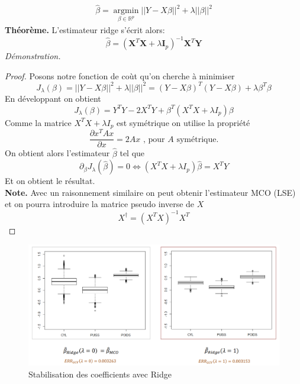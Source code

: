 \documentclass[a4paper]{article}
\newtheorem{proof}{Démonstration}
\begin{document}
\begin{align}
    \hat{\beta} =\underset{{\beta \in \mathbb{R}^p}}{\operatorname{argmin}}  ||Y-X\beta||^2 + \lambda ||\beta||^2 
\end{align}
\textbf{Théorème.} L'estimateur ridge s'écrit alors:
\begin{equation}
    \hat{\beta} = (\textbf{X}^T \textbf{X} +\lambda\textbf{I}_p )^{-1} \textbf{X}^T \textbf{Y}
\end{equation}
\textit{Démonstration.} \begin{proof} Posons notre fonction de coùt qu'on cherche à minimiser
\begin{equation}
    J_{\lambda}(\beta) = ||Y-X\beta||^2 + \lambda ||\beta||^2 = (Y-X\beta)^T(Y-X\beta) + \lambda \beta^T \beta
\end{equation}
En développant on obtient 
\begin{equation*}
    J_{\lambda}(\beta) = Y^T Y - 2X^T Y + \beta^T (X^T X + \lambda I_p) \beta 
\end{equation*}
Comme la matrice $X^T X + \lambda I_p$ est symétrique on utilise la propriété
\begin{equation}
    \frac{\partial x^T A x}{\partial x} = 2 A x \text{  , pour $A$ symétrique.}
\end{equation}
On obtient alors l'estimateur $\hat{\beta}$ tel que
\begin{equation*}
    \partial_{\beta} J_{\lambda} (\hat{\beta}) = 0 \Leftrightarrow (X^T X + \lambda I_p) \hat{\beta} = X^T Y
\end{equation*}
Et on obtient le résultat.\\
\textbf{Note.} Avec un raisonnement similaire on peut obtenir l'estimateur MCO (LSE) et on pourra introduire la matrice pseudo inverse de $X$
\begin{equation}
    X^{\dagger} = (X^T X)^{-1}X^T 
\end{equation}
\end{proof}
\begin{figure}[H]
    \centering
    \includegraphics[scale=0.5]{figures/ridge_perfo.png}
    \caption{Stabilisation des coefficients avec Ridge}
    \label{fig:enter-label}
\end{figure}
\end{document}
